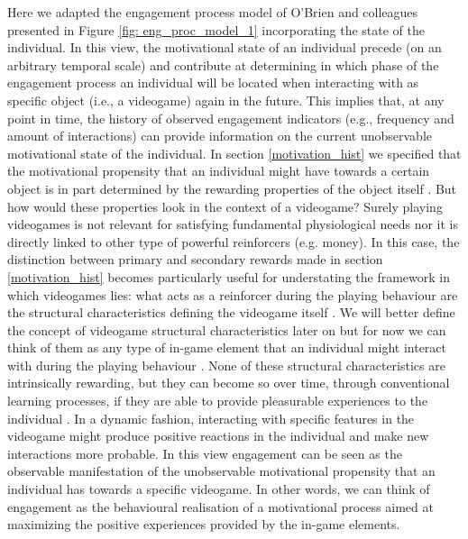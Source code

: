 Here we adapted the engagement process model of O'Brien and colleagues \cite{o2008user} presented in Figure \ref{fig: eng_proc_model_1} incorporating the state of the individual. In this view, the motivational state of an individual precede (on an arbitrary temporal scale) and contribute at determining in which phase of the engagement process an individual will be located when interacting with as specific object (i.e., a videogame) again in the future. This implies that, at any point in time, the history of observed engagement indicators (e.g., frequency and amount of interactions) can provide information on the current unobservable motivational state of the individual. In section \ref{motivation_hist} we specified that the motivational propensity that an individual might have towards a certain object is in part determined by the rewarding properties of the object itself \cite{berridge2004motivation}. But how would these properties look in the context of a videogame? Surely playing videogames is not relevant for satisfying fundamental physiological needs nor it is directly linked to other type of powerful reinforcers (e.g. money). In this case, the distinction between primary and secondary rewards made in section \ref{motivation_hist} becomes particularly useful for understating the framework in which videogames lies: what acts as a reinforcer during the playing behaviour are the structural characteristics defining the videogame itself \cite{king2010role, king2010video, yannakakis2013player}. We will better define the concept of videogame structural characteristics later on but for now we can think of them as any type of in-game element that an individual might interact with during the playing behaviour \cite{king2010role,king2010video}. None of these structural characteristics are intrinsically rewarding, but they can become so over time, through conventional learning processes, if they are able to provide pleasurable experiences to the individual \cite{skinner1953science, berridge2004motivation, przybylski2010motivational}. In a dynamic fashion, interacting with specific features in the videogame might produce positive reactions in the individual and make new interactions more probable. In this view engagement can be seen as the observable manifestation of the unobservable motivational propensity that an individual has towards a specific videogame. In other words, we can think of engagement as the behavioural realisation of a motivational process aimed at maximizing the positive experiences provided by the in-game elements. 

